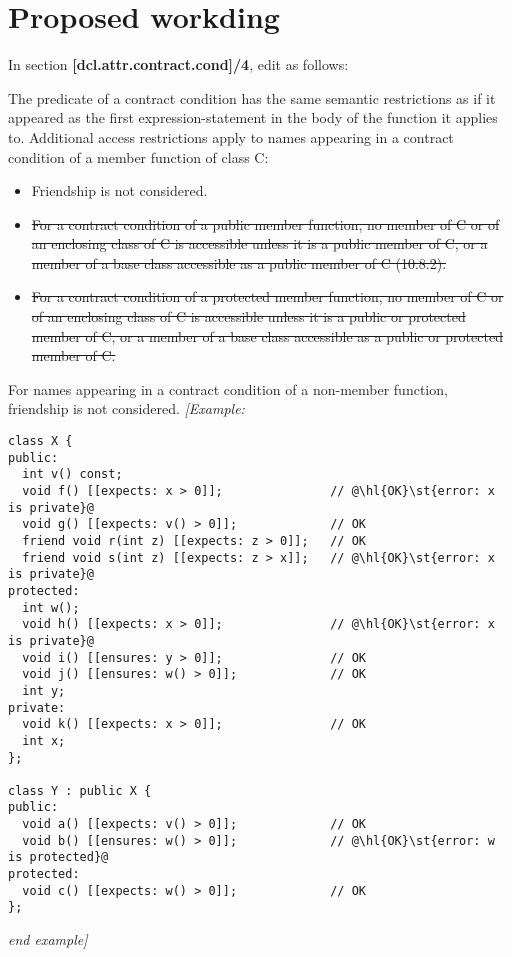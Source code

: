 \section{Proposed workding}

In section \textbf{[dcl.attr.contract.cond]/4}, edit as follows:

The predicate of a contract condition has the same semantic restrictions as if
it appeared as the first expression-statement in the body of the function it
applies to. Additional access restrictions apply to names appearing in a
contract condition of a member function of class C:

\begin{itemize}

\item Friendship is not considered.

\item \st{For a contract condition of a public member function, no member
of C or of an enclosing class of C is
accessible unless it is a public member of C, or a member of a base
class accessible as a public member
of C (10.8.2).}

\item \st{For a contract condition of a protected member function, no member
of C or of an enclosing class of C
is accessible unless it is a public or protected member of C, or a
member of a base class accessible as a
public or protected member of C.}

\end{itemize}

For names appearing in a contract condition of a non-member function,
friendship is not considered. \emph{[Example:}

\begin{lstlisting}[escapechar=@]
class X {
public:
  int v() const;
  void f() [[expects: x > 0]];               // @\hl{OK}\st{error: x is private}@
  void g() [[expects: v() > 0]];             // OK
  friend void r(int z) [[expects: z > 0]];   // OK
  friend void s(int z) [[expects: z > x]];   // @\hl{OK}\st{error: x is private}@
protected:
  int w();
  void h() [[expects: x > 0]];               // @\hl{OK}\st{error: x is private}@
  void i() [[ensures: y > 0]];               // OK
  void j() [[ensures: w() > 0]];             // OK
  int y;
private:
  void k() [[expects: x > 0]];               // OK
  int x;
};

class Y : public X {
public:
  void a() [[expects: v() > 0]];             // OK
  void b() [[ensures: w() > 0]];             // @\hl{OK}\st{error: w is protected}@
protected:
  void c() [[expects: w() > 0]];             // OK
};

\end{lstlisting}

\emph{end example]}

